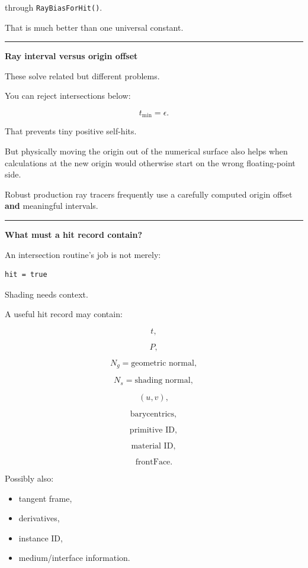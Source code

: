 through \texttt{RayBiasForHit()}.

That is much better than one universal constant.

\begin{center}\rule{0.5\linewidth}{0.5pt}\end{center}

\textbf{Ray interval versus origin offset}

These solve related but different problems.

You can reject intersections below:

\[
t_{\min}=\epsilon.
\]

That prevents tiny positive self-hits.

But physically moving the origin out of the numerical surface also helps when calculations at the new origin would otherwise start on the wrong floating-point side.

Robust production ray tracers frequently use a carefully computed origin offset \textbf{and} meaningful intervals.

\begin{center}\rule{0.5\linewidth}{0.5pt}\end{center}

\textbf{What must a hit record contain?}

An intersection routine's job is not merely:

\begin{verbatim}
hit = true
\end{verbatim}

Shading needs context.

A useful hit record may contain:

\[
t,
\]

\[
P,
\]

\[
N_g=\text{geometric normal},
\]

\[
N_s=\text{shading normal},
\]

\[
(u,v),
\]

\[
\text{barycentrics},
\]

\[
\text{primitive ID},
\]

\[
\text{material ID},
\]

\[
\text{frontFace}.
\]

Possibly also:

\begin{itemize}
\tightlist
\item
  tangent frame,
\item
  derivatives,
\item
  instance ID,
\item
  medium/interface information.
\end{itemize}

